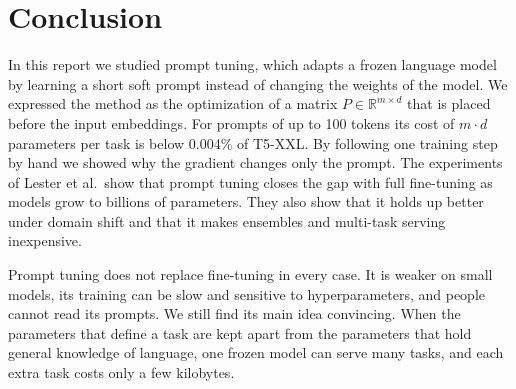 \documentclass[12pt]{article}
\newcommand{\R}{\mathbb{R}}
\begin{document}
\section{Conclusion}\label{sec:conclusion}

In this report we studied prompt tuning, which adapts a frozen language model by learning a
short soft prompt instead of changing the weights of the model. We expressed the method as
the optimization of a matrix $P\in\R^{m\times d}$ that is placed before the input embeddings.
For prompts of up to 100 tokens its cost of $m\cdot d$ parameters per task is below 0.004\%
of T5-XXL. By following one training step by hand we showed why the gradient changes only the
prompt. The experiments of Lester et al.\ show that prompt tuning closes the gap with full
fine-tuning as models grow to billions of parameters. They also show that it holds up better
under domain shift and that it makes ensembles and multi-task serving inexpensive.

Prompt tuning does not replace fine-tuning in every case. It is weaker on small models, its
training can be slow and sensitive to hyperparameters, and people cannot read its prompts.
We still find its main idea convincing. When the parameters that define a task are kept
apart from the parameters that hold general knowledge of language, one frozen model can serve
many tasks, and each extra task costs only a few kilobytes.
\end{document}
